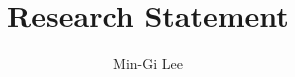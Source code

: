 \documentclass[a4paper,11pt]{article}
\begin{document}
\title{Research Statement}
\author{Min-Gi Lee}%
\date{}

\maketitle
\renewcommand{\thefootnote}{\arabic{footnote}}


\maketitle

\end{document}
